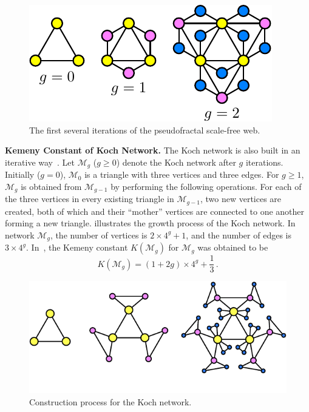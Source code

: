 \documentclass[10pt,twocolumn,twoside]{IEEEtran}
\begin{document}
\begin{figure}[!t]
    \centering
    \includegraphics[width=0.75\linewidth]{Pseudofractal-eps-converted-to.pdf}
    \caption{The first several iterations of the pseudofractal scale-free web. }
    \label{psfw1}
\end{figure}

\textbf{Kemeny Constant of  Koch Network.}
The Koch network is also built in an iterative way~\cite{ZhZhXiLiGu09}. Let \(\mathcal{M}_{g}\) (\(g \geq 0\)) denote the Koch network after \(g\) iterations. Initially (\(g=0\)), \(\mathcal{M}_{0}\) is a triangle with three
vertices and three edges. For \(g\geq 1\), \(\mathcal{M}_{g}\) is obtained from \(\mathcal{M}_{g-1}\) by
performing the following operations. For each of the three vertices in
every existing triangle in \(\mathcal{M}_{g-1}\), two new vertices are created, both of which and their
``mother'' vertices are connected to one another forming a new triangle.  illustrates the growth process of the Koch network.  In network \(\mathcal{M}_{g}\), the number of vertices is \(2\times 4^{g}+1\), and the number of
edges is \(3\times 4^{g}\).  In~\cite{XiLiZh15}, the Kemeny constant \(K(\mathcal{M}_g)\) for \(\mathcal{M}_g\) was obtained to be
\begin{equation}\label{Kg02}
    K(\mathcal{M}_g)=(1+2g)\times 4^g+\frac{1}{3}\,. %
\end{equation}

\begin{figure}[!t]
    \centering
    \includegraphics[width=0.85\linewidth]{Koch-eps-converted-to.pdf}
    \caption{Construction process for the Koch network.}
    \label{network}
\end{figure}
\end{document}
